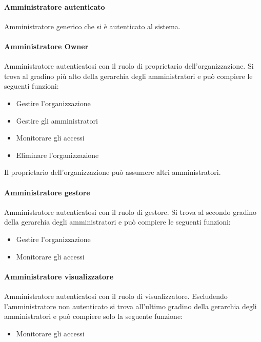 \paragraph{Amministratore autenticato}
Amministratore generico che si è autenticato al sistema.
\paragraph{Amministratore Owner}
Amministratore autenticatosi con il ruolo di proprietario dell'organizzazione.
Si trova al gradino più alto della gerarchia degli amministratori e può compiere le seguenti funzioni:
\begin{itemize}
\item Gestire l'organizzazione
\item Gestire gli amministratori
\item Monitorare gli accessi
\item Eliminare l'organizzazione
\end{itemize}
Il proprietario dell'organizzazione può assumere altri amministratori.
\paragraph{Amministratore gestore}
Amministratore autenticatosi con il ruolo di gestore. 
Si trova al secondo gradino della gerarchia degli amministratori e può compiere le seguenti funzioni:
\begin{itemize}
\item Gestire l'organizzazione
\item Monitorare gli accessi
\end{itemize}
\paragraph{Amministratore visualizzatore}
Amministratore autenticatosi con il ruolo di visualizzatore.
Escludendo l'amministratore non autenticato si trova all'ultimo gradino della gerarchia degli amministratori e può compiere solo la seguente funzione:
\begin{itemize}
\item Monitorare gli accessi
\end{itemize}




